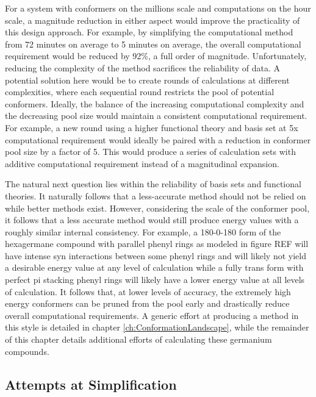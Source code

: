 For a system with conformers on the millions scale and computations on the hour scale, a magnitude reduction in either aspect would improve the practicality of this design approach.
For example, by simplifying the computational method from 72 minutes on average to 5 minutes on average, the overall computational requirement would be reduced by 92\%, a full order of magnitude. 
Unfortunately, reducing the complexity of the method sacrifices the reliability of data.
A potential solution here would be to create rounds of calculations at different complexities, where each sequential round restricts the pool of potential conformers.
Ideally, the balance of the increasing computational complexity and the decreasing pool size would maintain a consistent computational requirement.
For example, a new round using a higher functional theory and basis set at 5x computational requirement would ideally be paired with a reduction in conformer pool size by a factor of 5.
This would produce a series of calculation sets with additive computational requirement instead of a magnitudinal expansion.

The natural next question lies within the reliability of basis sets and functional theories. 
It naturally follows that a less-accurate method should not be relied on while better methods exist. 
However, considering the scale of the conformer pool, it follows that a less accurate method would still produce energy values with a roughly similar internal consistency. 
For example, a 180-0-180 form of the hexagermane compound with parallel phenyl rings as modeled in figure
REF
will have intense syn interactions between some phenyl rings and will likely not yield a desirable energy value at any level of calculation while a fully trans form with perfect pi stacking phenyl rings will likely have a lower energy value at all levels of calculation.
It follows that, at lower levels of accuracy, the extremely high energy conformers can be pruned from the pool early and drastically reduce overall computational requirements.
A generic effort at producing a method in this style is detailed in chapter \ref{ch:ConformationLandscape}, while the remainder of this chapter details additional efforts of calculating these germanium compounds.

\subsection{Attempts at Simplification}

